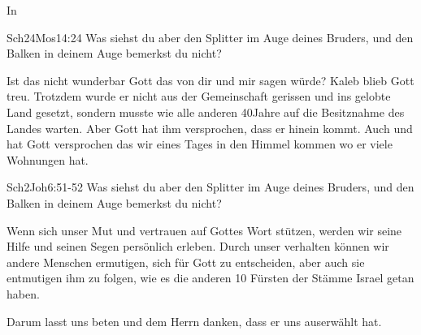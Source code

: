 \documentclass[12pt,a4paper]{scrarticle}
\begin{document}
In 
\begin{bibeltext}{Sch2}{4Mos}{14:24}
    Was siehst du aber den Splitter im Auge deines Bruders, und den Balken in deinem
Auge bemerkst du nicht?
\end{bibeltext}
Ist das nicht wunderbar Gott das von dir und mir sagen würde? Kaleb blieb Gott treu. Trotzdem wurde er nicht aus der Gemeinschaft gerissen und ins gelobte Land gesetzt, sondern musste wie alle anderen 40Jahre auf die Besitznahme des Landes warten. Aber Gott hat ihm versprochen, dass er hinein kommt. 
Auch und hat Gott versprochen das wir eines Tages in den Himmel kommen wo er viele Wohnungen hat.
\begin{bibeltext}{Sch2}{Joh}{6:51-52}
    Was siehst du aber den Splitter im Auge deines Bruders, und den Balken in deinem
Auge bemerkst du nicht?
\end{bibeltext}
Wenn sich unser Mut und vertrauen auf Gottes Wort stützen, werden wir seine Hilfe und seinen Segen persönlich erleben. Durch unser verhalten können wir andere Menschen ermutigen, sich für Gott zu entscheiden, aber auch sie entmutigen ihm zu folgen, wie es die anderen 10 Fürsten der Stämme Israel getan haben.

Darum lasst uns beten und dem Herrn danken, dass er uns auserwählt hat.
\end{document}
